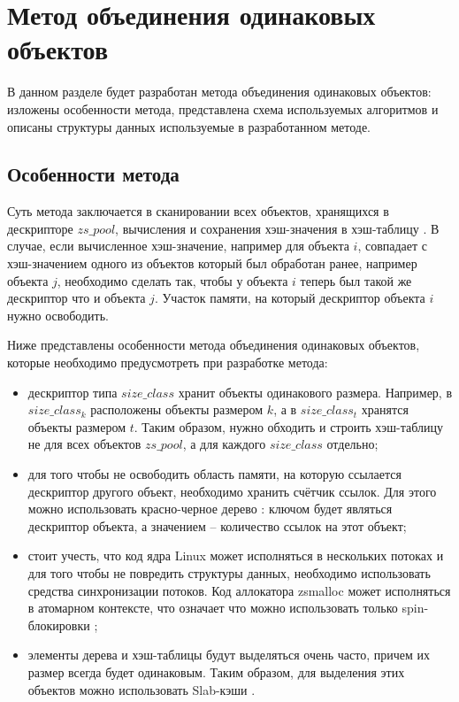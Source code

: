 \section{Метод объединения одинаковых объектов}

В данном разделе будет разработан метода объединения одинаковых объектов: изложены особенности метода, представлена схема используемых алгоритмов и описаны структуры данных используемые в разработанном методе.

\subsection{Особенности метода}

Суть метода заключается в сканировании всех объектов, хранящихся в дескрипторе $zs\_pool$, вычисления и сохранения хэш-значения в хэш-таблицу \cite{hash-table}. В случае, если вычисленное хэш-значение, например для объекта $i$, совпадает с хэш-значением одного из объектов который был обработан ранее, например объекта $j$, необходимо сделать так, чтобы у объекта $i$ теперь был такой же дескриптор что и объекта $j$. Участок памяти, на который дескриптор объекта $i$ нужно освободить.

Ниже представлены особенности метода объединения одинаковых объектов, которые необходимо предусмотреть при разработке метода:

\begin{itemize}
	\item дескриптор типа $size\_class$ хранит объекты одинакового размера. Например, в $size\_class_{k}$ расположены объекты размером $k$, а в $size\_class_{t}$ хранятся объекты размером $t$. Таким образом, нужно обходить и строить хэш-таблицу не для всех объектов $zs\_pool$, а для каждого $size\_class$ отдельно;
	
	\item для того чтобы не освободить область памяти, на которую ссылается дескриптор другого объект, необходимо хранить счётчик ссылок. Для этого можно использовать красно-черное дерево \cite{rbtree}: ключом будет являться дескриптор объекта, а значением -- количество ссылок на этот объект;
	
	\item стоит учесть, что код ядра Linux может исполняться в нескольких потоках и для того чтобы не повредить структуры данных, необходимо использовать средства синхронизации потоков. Код аллокатора zsmalloc может исполняться в атомарном контексте, что означает что можно использовать только spin-блокировки \cite{spinlock};
	
	\item элементы дерева и хэш-таблицы будут выделяться очень часто, причем их размер всегда будет одинаковым. Таким образом, для выделения этих объектов можно использовать Slab-кэши \cite{slab-cache}. 
\end{itemize}

